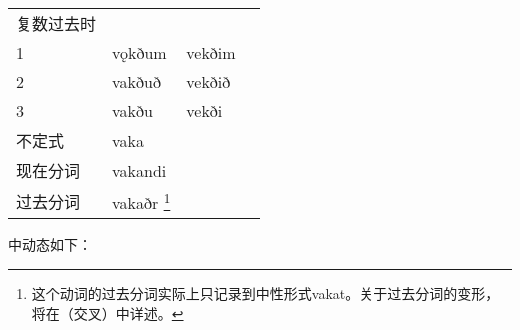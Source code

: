 \begin{longtable}{llll}
    复数过去时 &                                                                                                           &        &       \\
    1          & vǫkðum                                                                                                    & vekðim &       \\
    2          & vakðuð                                                                                                    & vekðið &       \\
    3          & vakðu                                                                                                     & vekði  &       \\
    不定式     & vaka                                                                                                      &        &       \\
    现在分词   & vakandi                                                                                                   &        &       \\
    过去分词   & vakaðr \footnote{这个动词的过去分词实际上只记录到中性形式vakat。关于过去分词的变形，将在（交叉）中详述。}
               &                                                                                                           &                \\
\end{longtable}

中动态如下：

